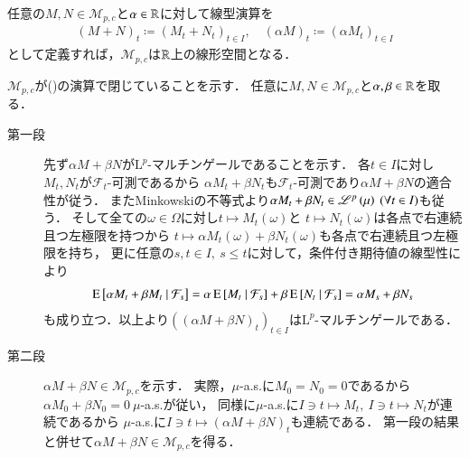 	\begin{screen}
		\begin{lem}
			任意の$M,N \in \mathcal{M}_{p,c}$と$\alpha \in \mathbb{R}$に対して線型演算を
			\begin{align}
				(M + N)_t \coloneqq (M_t + N_t)_{t \in I}, 
				\quad (\alpha M)_t \coloneqq (\alpha M_t)_{t \in I}
				\label{eq:mart_linear_arithmetic_0}
			\end{align}
			として定義すれば，$\mathcal{M}_{p,c}$は$\mathbb{R}$上の線形空間となる．
		\end{lem}
	\end{screen}
	
	
	\begin{prf}
		$\mathcal{M}_{p,c}$が()の演算で閉じていることを示す．
		任意に$M,N \in \mathcal{M}_{p,c}$と$\alpha, \beta \in \mathbb{R}$を取る．
		\begin{description}
			\item[第一段]
				先ず$\alpha M + \beta N$が$\mathrm{L}^p$-マルチンゲールであることを示す．
				各$t \in I$に対し$M_t,N_t$が$\mathcal{F}_t$-可測であるから
				$\alpha M_t + \beta N_t$も$\mathcal{F}_t$-可測であり$\alpha M + \beta N$の適合性が従う．
				またMinkowskiの不等式より$\alpha M_t + \beta N_t \in \mathscr{L}^{p} \left(\mu\right)\ (\forall t \in I)$も従う．
				そして全ての$\omega \in \Omega$に対し$t \longmapsto M_t(\omega)$と
				$t \longmapsto N_t(\omega)$は各点で右連続且つ左極限を持つから
				$t \longmapsto \alpha M_t(\omega) + \beta N_t(\omega)$も各点で右連続且つ左極限を持ち，
				更に任意の$s,t \in I,\ s \leq t$に対して，条件付き期待値の線型性により
				\begin{align}
					\operatorname{E} \left[ \alpha M_t + \beta M_t \ \middle|\ \mathcal{F}_s \right] 
					= \alpha \operatorname{E} \left[ M_t \ \middle|\ \mathcal{F}_s \right] + \beta \operatorname{E} \left[ N_t \ \middle|\ \mathcal{F}_s \right] 
					= \alpha M_s + \beta N_s
				\end{align}
				も成り立つ．以上より$\left( (\alpha M + \beta N)_t \right)_{t \in I}$は$\mathrm{L}^p$-マルチンゲールである．
			
			\item[第二段]
				$\alpha M + \beta N \in \mathcal{M}_{p,c}$を示す．
				実際，$\mu$-a.s.に$M_0 = N_0 = 0$であるから$\alpha M_0 + \beta N_0 = 0\ \mu$-a.s.が従い，
				同様に$\mu$-a.s.に$I \ni t \longmapsto M_t,\ I \ni t \longmapsto N_t$が連続であるから
				$\mu$-a.s.に$I \ni t \longmapsto (\alpha M + \beta N)_t$も連続である．
				第一段の結果と併せて$\alpha M + \beta N \in \mathcal{M}_{p,c}$を得る．
				\QED
		\end{description}		
	\end{prf}
	
